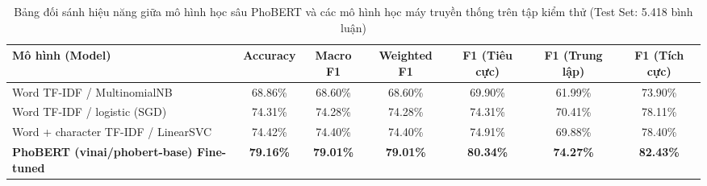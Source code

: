 
\begin{table}[htbp]
\centering
\caption{Bảng đối sánh hiệu năng giữa mô hình học sâu PhoBERT và các mô hình học máy truyền thống trên tập kiểm thử (Test Set: 5.418 bình luận)}
\label{tab:model_comparison}
\renewcommand{\arraystretch}{1.2}
\begin{tabular}{lcccccc}
\hline
\textbf{Mô hình (Model)} & \textbf{Accuracy} & \textbf{Macro F1} & \textbf{Weighted F1} & \textbf{F1 (Tiêu cực)} & \textbf{F1 (Trung lập)} & \textbf{F1 (Tích cực)} \\
\hline
Word TF-IDF / MultinomialNB & 68.86\% & 68.60\% & 68.60\% & 69.90\% & 61.99\% & 73.90\% \\
Word TF-IDF / logistic (SGD) & 74.31\% & 74.28\% & 74.28\% & 74.31\% & 70.41\% & 78.11\% \\
Word + character TF-IDF / LinearSVC & 74.42\% & 74.40\% & 74.40\% & 74.91\% & 69.88\% & 78.40\% \\
\textbf{PhoBERT (vinai/phobert-base) Fine-tuned} & \textbf{79.16\%} & \textbf{79.01\%} & \textbf{79.01\%} & \textbf{80.34\%} & \textbf{74.27\%} & \textbf{82.43\%} \\
\hline
\end{tabular}
\end{table}
